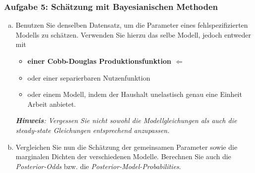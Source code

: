 \documentclass{beamer} %
\newcounter{saveenumi}
\newcommand{\conti}{\setcounter{enumi}{\value{saveenumi}}}
\begin{document}
\begin{frame}\frametitle{Aufgabe 5: Sch\"{a}tzung mit Bayesianischen Methoden}
  \begin{enumerate}[(a)]\conti
  \item Benutzen Sie denselben Datensatz, um die Parameter eines fehlspezifizierten Modells zu schätzen. Verwenden Sie hierzu das selbe Modell, jedoch entweder mit
      \begin{itemize}
      \item \textbf{einer Cobb-Douglas Produktionsfunktion $\Leftarrow$}
      \item oder einer separierbaren Nutzenfunktion
      \item oder einem Modell, indem der Haushalt unelastisch genau eine Einheit Arbeit anbietet.
      \end{itemize}\emph{\textbf{Hinweis}: Vergessen Sie nicht sowohl die Modellgleichungen als auch die steady-state Gleichungen entsprechend anzupassen.}
      \item Vergleichen Sie nun die Schätzung der gemeinsamen Parameter sowie die marginalen Dichten der verschiedenen Modelle. Berechnen Sie auch die \emph{Posterior-Odds} bzw. die \emph{Posterior-Model-Probabilities}.

\end{enumerate}
\end{frame}
\end{document}
